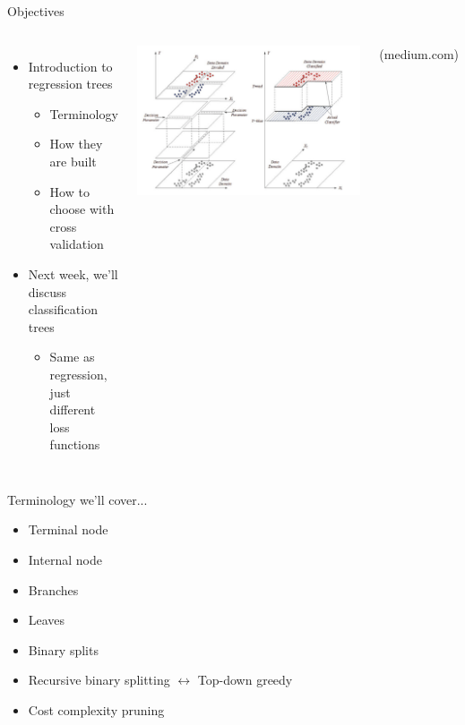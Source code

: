 \documentclass[mathserif, aspectratio=169]{beamer}
\begin{document}
\begin{frame}{Objectives}
\begin{columns}
\begin{itemize}
\item Introduction to regression trees
\begin{itemize}
\item Terminology
\item How they are built
\item How to choose with cross validation
\end{itemize}
\item Next week, we'll discuss classification trees
\begin{itemize}
\item Same as regression, just different loss functions
\end{itemize}
\end{itemize}


\includegraphics[width=\textwidth]{RTree_image}

{\tiny (medium.com)}
\end{columns}


\end{frame}



\begin{frame}{Terminology we'll cover...}
	\begin{itemize}
		\item Terminal node
		\item Internal node
		\item Branches
		\item Leaves
		\item Binary splits
		\item Recursive binary splitting $\leftrightarrow$ Top-down greedy 
		\item Cost complexity pruning
	\end{itemize}
\end{frame}
\end{document}

